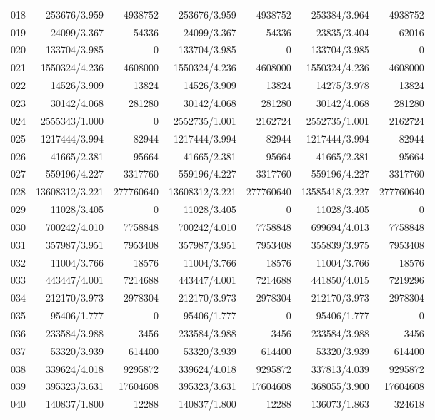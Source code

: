 \begin{longtable}{crrrrrr}
018 & 253676/3.959 & 4938752 & 253676/3.959 & 4938752 & 253384/3.964 & 4938752 \\
019 & 24099/3.367 & 54336 & 24099/3.367 & 54336 & 23835/3.404 & 62016 \\
020 & 133704/3.985 & 0 & 133704/3.985 & 0 & 133704/3.985 & 0 \\
021 & 1550324/4.236 & 4608000 & 1550324/4.236 & 4608000 & 1550324/4.236 & 4608000 \\
022 & 14526/3.909 & 13824 & 14526/3.909 & 13824 & 14275/3.978 & 13824 \\
023 & 30142/4.068 & 281280 & 30142/4.068 & 281280 & 30142/4.068 & 281280 \\
024 & 2555343/1.000 & 0 & 2552735/1.001 & 2162724 & 2552735/1.001 & 2162724 \\
025 & 1217444/3.994 & 82944 & 1217444/3.994 & 82944 & 1217444/3.994 & 82944 \\
026 & 41665/2.381 & 95664 & 41665/2.381 & 95664 & 41665/2.381 & 95664 \\
027 & 559196/4.227 & 3317760 & 559196/4.227 & 3317760 & 559196/4.227 & 3317760 \\
028 & 13608312/3.221 & 277760640 & 13608312/3.221 & 277760640 & 13585418/3.227 & 277760640 \\
029 & 11028/3.405 & 0 & 11028/3.405 & 0 & 11028/3.405 & 0 \\
030 & 700242/4.010 & 7758848 & 700242/4.010 & 7758848 & 699694/4.013 & 7758848 \\
031 & 357987/3.951 & 7953408 & 357987/3.951 & 7953408 & 355839/3.975 & 7953408 \\
032 & 11004/3.766 & 18576 & 11004/3.766 & 18576 & 11004/3.766 & 18576 \\
033 & 443447/4.001 & 7214688 & 443447/4.001 & 7214688 & 441850/4.015 & 7219296 \\
034 & 212170/3.973 & 2978304 & 212170/3.973 & 2978304 & 212170/3.973 & 2978304 \\
035 & 95406/1.777 & 0 & 95406/1.777 & 0 & 95406/1.777 & 0 \\
036 & 233584/3.988 & 3456 & 233584/3.988 & 3456 & 233584/3.988 & 3456 \\
037 & 53320/3.939 & 614400 & 53320/3.939 & 614400 & 53320/3.939 & 614400 \\
038 & 339624/4.018 & 9295872 & 339624/4.018 & 9295872 & 337813/4.039 & 9295872 \\
039 & 395323/3.631 & 17604608 & 395323/3.631 & 17604608 & 368055/3.900 & 17604608 \\
040 & 140837/1.800 & 12288 & 140837/1.800 & 12288 & 136073/1.863 & 324618 \\

\end{longtable}
